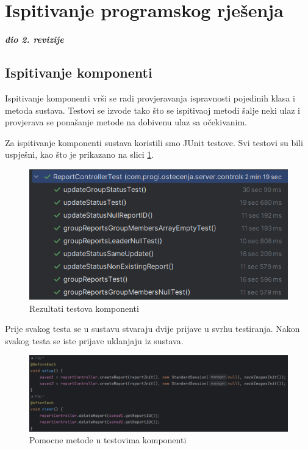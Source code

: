 			\eject 
		
	
		\section{Ispitivanje programskog rješenja}
			
			\textbf{\textit{dio 2. revizije}}\\
			
			\subsection{Ispitivanje komponenti}
			
			Ispitivanje komponenti vrši se radi provjeravanja ispravnosti pojedinih klasa i metoda sustava. Testovi se izvode tako što se ispitivaoj metodi šalje neki ulaz i provjerava se ponašanje metode na dobivenu ulaz sa očekivanim.
			
			Za ispitivanje komponenti sustava koristili smo JUnit testove. Svi testovi su bili uspješni, kao što je prikazano na slici \ref{fig:JUnitTestovi}.
			
			\begin{figure}[H]
				\includegraphics[width=\textwidth]{slike/JUnitTestoviRez.png} %
				\caption{Rezultati testova komponenti}
				\label{fig:JUnitTestovi} %
			\end{figure}
			
			Prije svakog testa se u sustavu stvaraju dvije prijave u svrhu testiranja. Nakon svakog testa se iste prijave uklanjaju iz sustava.
			
			\begin{figure}[H]
				\includegraphics[width=\textwidth]{slike/JUnitTestoviPomocneMetode.png} %
				\caption{Pomocne metode u testovima komponenti}
				\label{fig:JUnitTestoviPomocne} %
			\end{figure}
			
